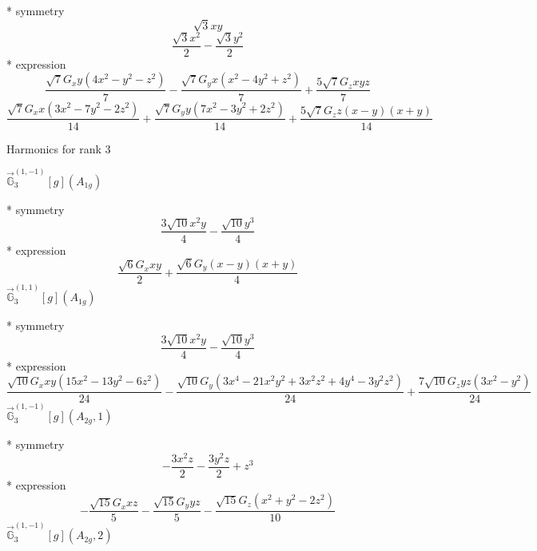 \documentclass[fleqn,8pt]{jsarticle}
\begin{document}
\noindent\quad ** symmetry
\begin{dmath*}
\sqrt{3} x y
\end{dmath*}
\begin{dmath*}
\frac{\sqrt{3} x^{2}}{2} - \frac{\sqrt{3} y^{2}}{2}
\end{dmath*}
\noindent\quad ** expression
\begin{dmath*}
\frac{\sqrt{7} G_{x} y \left(4 x^{2} - y^{2} - z^{2}\right)}{7} - \frac{\sqrt{7} G_{y} x \left(x^{2} - 4 y^{2} + z^{2}\right)}{7} + \frac{5 \sqrt{7} G_{z} x y z}{7}
\end{dmath*}
\begin{dmath*}
\frac{\sqrt{7} G_{x} x \left(3 x^{2} - 7 y^{2} - 2 z^{2}\right)}{14} + \frac{\sqrt{7} G_{y} y \left(7 x^{2} - 3 y^{2} + 2 z^{2}\right)}{14} + \frac{5 \sqrt{7} G_{z} z \left(x - y\right) \left(x + y\right)}{14}
\end{dmath*}

\noindent * Harmonics for rank 3

\noindent\quad $\vec{\mathbb{G}}_{3}^{(1,-1)}[g](A_{1g})$

\noindent\quad ** symmetry
\begin{dmath*}
\frac{3 \sqrt{10} x^{2} y}{4} - \frac{\sqrt{10} y^{3}}{4}
\end{dmath*}
\noindent\quad ** expression
\begin{dmath*}
\frac{\sqrt{6} G_{x} x y}{2} + \frac{\sqrt{6} G_{y} \left(x - y\right) \left(x + y\right)}{4}
\end{dmath*}
\noindent\quad $\vec{\mathbb{G}}_{3}^{(1,1)}[g](A_{1g})$

\noindent\quad ** symmetry
\begin{dmath*}
\frac{3 \sqrt{10} x^{2} y}{4} - \frac{\sqrt{10} y^{3}}{4}
\end{dmath*}
\noindent\quad ** expression
\begin{dmath*}
\frac{\sqrt{10} G_{x} x y \left(15 x^{2} - 13 y^{2} - 6 z^{2}\right)}{24} - \frac{\sqrt{10} G_{y} \left(3 x^{4} - 21 x^{2} y^{2} + 3 x^{2} z^{2} + 4 y^{4} - 3 y^{2} z^{2}\right)}{24} + \frac{7 \sqrt{10} G_{z} y z \left(3 x^{2} - y^{2}\right)}{24}
\end{dmath*}
\noindent\quad $\vec{\mathbb{G}}_{3}^{(1,-1)}[g](A_{2g},1)$

\noindent\quad ** symmetry
\begin{dmath*}
- \frac{3 x^{2} z}{2} - \frac{3 y^{2} z}{2} + z^{3}
\end{dmath*}
\noindent\quad ** expression
\begin{dmath*}
- \frac{\sqrt{15} G_{x} x z}{5} - \frac{\sqrt{15} G_{y} y z}{5} - \frac{\sqrt{15} G_{z} \left(x^{2} + y^{2} - 2 z^{2}\right)}{10}
\end{dmath*}
\noindent\quad $\vec{\mathbb{G}}_{3}^{(1,-1)}[g](A_{2g},2)$
\end{document}
